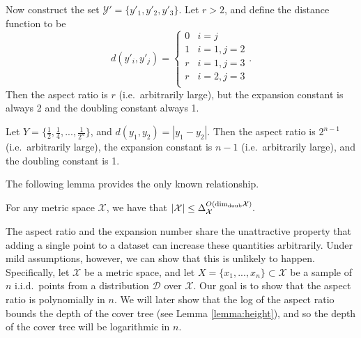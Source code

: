 \documentclass[thesis.tex]{subfiles}
\newcommand{\set}[1]{\mathcal {#1}}
\newcommand{\distribution}[1]{\mathcal {#1}}
\newcommand{\dist}[2]{\distf({#1},{#2})}
\newcommand{\distf}{d}
\newcommand{\aspect}[1]{\Delta_{#1}}
\newcommand{\doubdim}{\text{dim}_\textnormal{doub}}
\begin{document}
\begin{example}
    Now construct the set $\set Y'=\{y'_1, y'_2, y'_3\}$.
    Let $r>2$, and define the distance function to be
    \begin{equation}
        d(y'_i,y'_j) =
        \begin{cases}
            0 & i=j \\
            1 & i=1, j=2 \\
            r & i=1, j=3 \\
            r & i=2, j=3 \\
        \end{cases}
        .
    \end{equation}
    Then the aspect ratio is $r$ (i.e.\ arbitrarily large),
    but the expansion constant is always 2
    and the doubling constant always 1.
\end{example}

\begin{example}
    \label{example:dc1}
    Let $Y=\{\frac 1 2, \frac 1 4, ..., \frac 1 {2^n}\}$,
    and $\dist{y_1}{y_2}=|y_1-y_2|$.
    Then the aspect ratio is $2^{n-1}$ (i.e.\ arbitrarily large),
    the expansion constant is $n-1$ (i.e.\ arbitrarily large),
    and the doubling constant is 1.
\end{example}

\noindent
The following lemma provides the only known relationship.

\begin{lemma}
    For any metric space $\set X$, we have that
    $
        |\set X| \le \aspect{\set X}^{O(\doubdim{\set X})}.
    $
\end{lemma}



The aspect ratio and the expansion number share the unattractive property that adding a single point to a dataset can increase these quantities arbitrarily.
Under mild assumptions, however, we can show that this is unlikely to happen.
Specifically, let $\set X$ be a metric space, 
and let $X=\{x_1,...,x_n\}\subset\set X$ be a sample of $n$ i.i.d.\ points from a distribution $\distribution D$ over $\set X$.
Our goal is to show that the aspect ratio is polynomially in $n$.
We will later show that the log of the aspect ratio bounds the depth of the cover tree (see Lemma \ref{lemma:height}),
and so the depth of the cover tree will be logarithmic in $n$.
\end{document}
